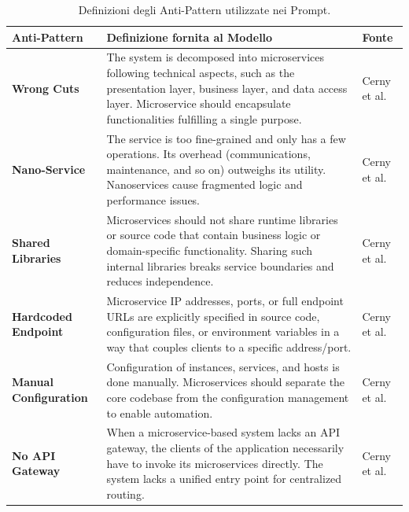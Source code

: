 \begin{table}[H]
    \centering
    \scriptsize
    \renewcommand{\arraystretch}{1.3}
    \caption{Definizioni degli Anti-Pattern utilizzate nei Prompt.}
    \label{tab:ap_definitions}
    \begin{tabular}{| p{3cm} | p{8.5cm} | p{3cm} |}
        \hline
        \textbf{Anti-Pattern} & \textbf{Definizione fornita al Modello} & \textbf{Fonte} \\ \hline
        
        \textbf{Wrong Cuts} & The system is decomposed into microservices following technical aspects, such as the presentation layer, business layer, and data access layer. Microservice should encapsulate functionalities fulfilling a single purpose. & Cerny et al. \cite{CernyCatalogo} \\ \hline

        \textbf{Nano-Service} & The service is too fine-grained and only has a few operations. Its overhead (communications, maintenance, and so on) outweighs its utility. Nanoservices cause fragmented logic and performance issues. & Cerny et al. \cite{CernyCatalogo} \\ \hline

        \textbf{Shared Libraries} & Microservices should not share runtime libraries or source code that contain business logic or domain-specific functionality. Sharing such internal libraries breaks service boundaries and reduces independence. & Cerny et al. \cite{CernyCatalogo} \\ \hline

        \textbf{Hardcoded \newline Endpoint} & Microservice IP addresses, ports, or full endpoint URLs are explicitly specified in source code, configuration files, or environment variables in a way that couples clients to a specific address/port. & Cerny et al. \cite{CernyCatalogo} \\ \hline

        \textbf{Manual \newline Configuration} & Configuration of instances, services, and hosts is done manually. Microservices should separate the core codebase from the configuration management to enable automation. & Cerny et al. \cite{CernyCatalogo} \\ \hline

        \textbf{No API Gateway} & When a microservice-based system lacks an API gateway, the clients of the application necessarily have to invoke its microservices directly. The system lacks a unified entry point for centralized routing. & Cerny et al. \cite{CernyCatalogo} \\ \hline


\end{tabular}
\end{table}
